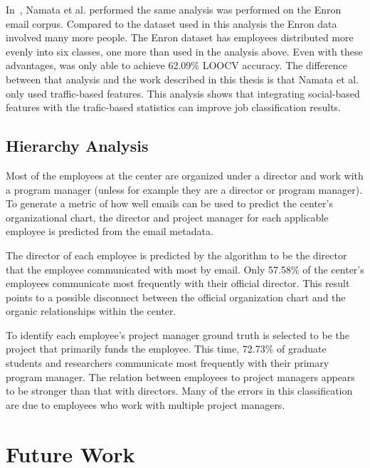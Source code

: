 \documentclass[12pt]{report}
\begin{document}
In~\cite{namata_inferring_2006}, Namata et al. performed the same analysis was performed on the Enron email corpus.
Compared to the dataset used in this analysis the Enron data involved many more people.
The Enron dataset has employees distributed more evenly into six classes, one more than used in the analysis above.
Even with these advantages, \cite{namata_inferring_2006} was only able to achieve 62.09\% LOOCV accuracy.
The difference between that analysis and the work described in this thesis is that Namata et al. only used traffic-based features.
This analysis shows that integrating social-based features with the trafic-based statistics can improve job classification results.

\section{Hierarchy Analysis}
Most of the employees at the center are organized under a director and work with a program manager (unless for example they are a director or program manager).
To generate a metric of how well emails can be used to predict the center's organizational chart, the director and project manager for each applicable employee is predicted from the email metadata. 

The director of each employee is predicted by the algorithm to be the director that the employee communicated with most by email.
Only 57.58\% of the center's employees communicate most frequently with their official director.
This result points to a possible disconnect between the official organization chart and the organic relationships within the center.

To identify each employee's project manager ground truth is selected to be the project that primarily funds the employee.
This time, 72.73\% of graduate students and researchers communicate most frequently with their primary program manager.
The relation between employees to project managers appears to be stronger than that with directors.
Many of the errors in this classification are due to employees who work with multiple project managers.  

\chapter{Future Work} \label{FutureWork}
\end{document}
